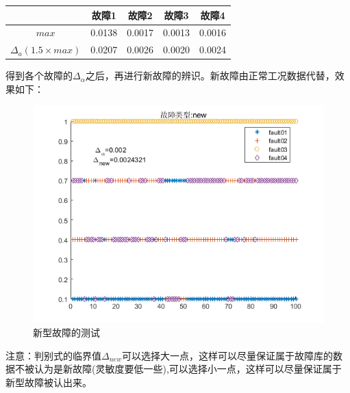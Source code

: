 \documentclass[lang=cn,11pt,a4paper]{elegantpaper}
\begin{document}
\begin{table}[]
	\centering
	\begin{tabular}{ccccc}
		\hline
		& 故障1    & 故障2    & 故障3    & 故障4    \\ \hline
		$max$      & 0.0138 & 0.0017 & 0.0013 & 0.0016 \\
		$\Delta_a(1.5\times max)$ & 0.0207 & 0.0026 & 0.0020 & 0.0024 \\ \hline
	\end{tabular}
\end{table}
得到各个故障的$\Delta_\alpha$之后，再进行新故障的辨识。新故障由正常工况数据代替，效果如下：
\begin{figure}[H] %
	\centering %
	\includegraphics[width=1.0\textwidth]{exp5_6} %
	\caption{新型故障的测试} %
	\label{Fig.main2} %
\end{figure}
\begin{shaded}
	注意：判别式的临界值$\Delta_{new}$可以选择大一点，这样可以尽量保证属于故障库的数据不被认为是新故障(灵敏度要低一些),可以选择小一点，这样可以尽量保证属于新型故障被认出来。
\end{shaded}
\end{document}
